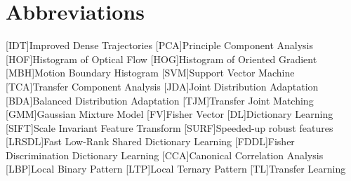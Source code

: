 \chapter*{Abbreviations}

\begin{acronym}
	[IDT]{Improved Dense Trajectories}
	[PCA]{Principle Component Analysis}
	[HOF]{Histogram of Optical Flow}
	[HOG]{Histogram of Oriented Gradient}
	[MBH]{Motion Boundary Histogram}
	[SVM]{Support Vector Machine}
	[TCA]{Transfer Component Analysis}
	[JDA]{Joint Distribution Adaptation}
	[BDA]{Balanced Distribution Adaptation}
	[TJM]{Transfer Joint Matching}
	[GMM]{Gaussian Mixture Model}
	[FV]{Fisher Vector} 
	[DL]{Dictionary Learning}
	[SIFT]{Scale Invariant Feature Transform}
	[SURF]{Speeded-up robust features} 
	[LRSDL]{Fast Low-Rank Shared Dictionary Learning}
	[FDDL]{Fisher Discrimination Dictionary Learning}
	[CCA]{Canonical Correlation Analysis}
	[LBP]{Local Binary Pattern}
	[LTP]{Local Ternary Pattern}
	[TL]{Transfer Learning}
\end{acronym}
